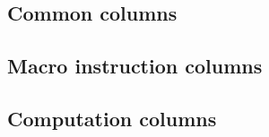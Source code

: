\subsection{Common columns}                     
\subsection{Macro instruction columns}          
\subsection{Computation columns}                

